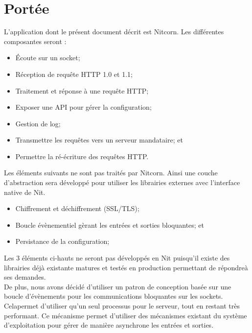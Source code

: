 \documentclass{scrreprt}
\begin{document}
\section{Portée}
L'application dont le présent document décrit est Nitcorn. Les différentes
composantes seront :
\begin{itemize}
    \item Écoute sur un socket;
    \item Réception de requête HTTP 1.0 et 1.1;
    \item Traitement et réponse à une requête HTTP;
    \item Exposer une API pour gérer la configuration;
    \item Gestion de log;
    \item Transmettre les requêtes vers un serveur mandataire; et
    \item Permettre la ré-écriture des requêtes HTTP.
\end{itemize}
Les éléments suivants ne sont pas traités par Nitcorn. Ainsi une couche
d'abstraction
sera développé pour utiliser les librairies externes avec l'interface native de
Nit.

\begin{itemize}
    \item Chiffrement et déchiffrement (SSL/TLS);
    \item Boucle évènementiel gèrant les entrées et sorties bloquantes; et
    \item Persistance de la configuration;
\end{itemize}

Les 3 éléments ci-hauts ne seront pas développés en Nit puisqu'il existe des
librairies déjà existante matures et testés en production permettant de répondreà ses demandes.
\\
De plus, nous avons décidé d'utiliser un patron de conception basée sur
une boucle d'évènements pour les communications bloquantes sur les sockets. Celapermet d'utiliser qu'un seul processus pour le serveur, tout en restant très
performant.
Ce mécanisme permet d'utiliser des mécanismes existant du système d'exploitation
pour
gérer de manière asynchrone les entrées et sorties\cite{c10k}.
\end{document}
